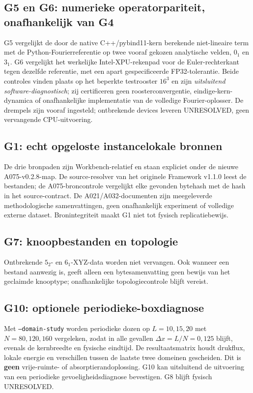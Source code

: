 \documentclass[10pt,a4paper]{article}
\begin{document}
\subsection{G5 en G6: numerieke operatorpariteit, onafhankelijk van G4}
G5 vergelijkt de door de native C++/pybind11-kern berekende niet-lineaire term
met de Python-Fourierreferentie op twee vooraf gekozen analytische velden,
$0_1$ en $3_1$. G6 vergelijkt het werkelijke Intel-XPU-rekenpad voor de
Euler-rechterkant tegen dezelfde referentie, met een apart gespecificeerde
FP32-tolerantie. Beide controles vinden plaats op het beperkte testrooster
$16^3$ en zijn \emph{uitsluitend software-diagnostisch}; zij certificeren geen
roosterconvergentie, eindige-kern-dynamica of onafhankelijke implementatie
van de volledige Fourier-oplosser. De drempels zijn vooraf ingesteld;
ontbrekende devices leveren UNRESOLVED, geen vervangende CPU-uitvoering.
\subsection{G1: echt opgeloste instancelokale bronnen}
De drie bronpaden zijn Workbench-relatief en staan expliciet onder de nieuwe
A075-v0.2.8-map. De source-resolver van het originele Framework v1.1.0 leest
de bestanden; de A075-broncontrole vergelijkt elke gevonden bytehash met
de hash in het source-contract. De A021/A032-documenten zijn meegeleverde
methodologische samenvattingen, geen onafhankelijk experiment of volledige
externe dataset. Bronintegriteit maakt G1 niet tot fysisch replicatiebewijs.
\subsection{G7: knoopbestanden en topologie}
Ontbrekende $5_2$- en $6_1$-XYZ-data worden niet vervangen. Ook wanneer een
bestand aanwezig is, geeft alleen een bytesamenvatting geen bewijs van het
geclaimde knooptype; onafhankelijke topologiecontrole blijft vereist.
\subsection{G10: optionele periodieke-boxdiagnose}
Met \texttt{--domain-study} worden periodieke dozen op $L=10,15,20$
met $N=80,120,160$ vergeleken, zodat in alle gevallen
$\Delta x=L/N=0{,}125$ blijft, evenals de kernbreedte en fysische eindtijd.
De resultaatsmatrix houdt drukflux, lokale energie en verschillen tussen
de laatste twee domeinen gescheiden. Dit is \textbf{geen} vrije-ruimte-
of absorptierandoplossing. G10 kan uitsluitend de uitvoering van een
periodieke gevoeligheidsdiagnose bevestigen. G8 blijft fysisch UNRESOLVED.
\end{document}
